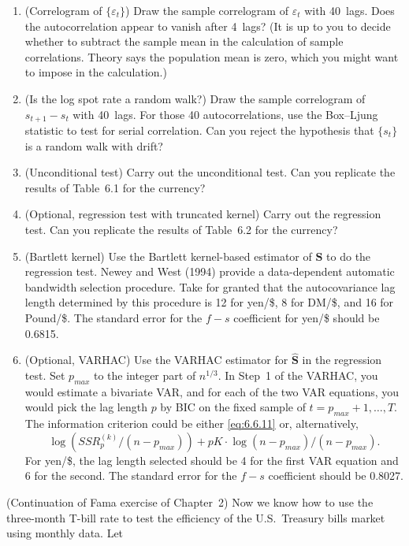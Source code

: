 \begin{problemset}
\begin{enumerate}[label=(\alph*)]
\item (Correlogram of $\{\varepsilon_t\}$) \; Draw the sample correlogram of $\varepsilon_t$ with 40~lags.
Does the autocorrelation appear to vanish after 4~lags? (It is up to you to
decide whether to subtract the sample mean in the calculation of sample
correlations. Theory says the population mean is zero, which you might
want to impose in the calculation.)

\item (Is the log spot rate a random walk?) \; Draw the sample correlogram of
$s_{t+1} - s_t$ with 40~lags. For those 40 autocorrelations, use the Box--Ljung
statistic to test for serial correlation. Can you reject the hypothesis that $\{s_t\}$
is a random walk with drift?

\item (Unconditional test) \; Carry out the unconditional test. Can you replicate
the results of Table~6.1 for the currency?

\item (Optional, regression test with truncated kernel) \; Carry out the regression
test. Can you replicate the results of Table~6.2 for the currency?

\item (Bartlett kernel) \; Use the Bartlett kernel-based estimator of $\mathbf{S}$ to do the
regression test. Newey and West (1994) provide a data-dependent automatic
bandwidth selection procedure. Take for granted that the autocovariance
lag length determined by this procedure is 12 for yen/\$, 8 for DM/\$,
and 16 for Pound/\$. The standard error for the $f - s$ coefficient for yen/\$ should be 0.6815.

\item (Optional, VARHAC) \; Use the VARHAC estimator for $\hat{\mathbf{S}}$ in the regression
test. Set $p_{max}$ to the integer part of $n^{1/3}$. In Step~1 of the VARHAC, you
would estimate a bivariate VAR, and for each of the two VAR equations,
you would pick the lag length $p$ by BIC on the fixed sample of $t = p_{max} +
1, \ldots, T$. The information criterion could be either \eqref{eq:6.6.11} or, alternatively,
\[
  \log(SSR_p^{(k)}/(n - p_{max})) + pK \cdot \log(n - p_{max})/(n - p_{max}).
\]
For yen/\$, the lag length selected should be 4 for the first VAR equation and 6 for the second.
The standard error for the $f - s$ coefficient should be 0.8027.
\end{enumerate}

\exercise[2] (Continuation of Fama exercise of Chapter~2) \; Now we know how to use
the three-month T-bill rate to test the efficiency of the U.S.\ Treasury bills market
using monthly data. Let


\end{problemset}
